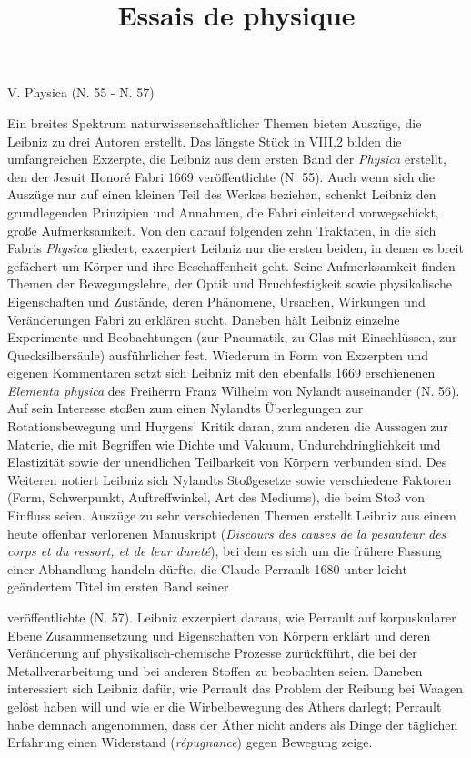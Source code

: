 \par
\vspace{3.0ex}
\noindent
V. Physica (N. 55 - N. 57)
\vspace{1.0ex}
\par\noindent
Ein breites Spektrum naturwissenschaftlicher Themen bieten Auszüge, die Leibniz zu drei Autoren erstellt. Das längste Stück in VIII,2 bilden die umfangreichen Exzerpte, die Leibniz aus dem ersten Band der \textit{Physica} erstellt, den der Jesuit Honoré Fabri 1669 veröffentlichte (N. 55). Auch wenn sich die Auszüge nur auf einen kleinen Teil des Werkes beziehen, schenkt Leibniz den grundlegenden Prinzipien und Annahmen, die Fabri einleitend vorwegschickt, gro{\ss}e Aufmerksamkeit. Von den darauf folgenden zehn Traktaten, in die sich Fabris \textit{Physica} gliedert, exzerpiert Leibniz nur die ersten beiden, in denen es breit gefächert um Körper und ihre Beschaffenheit geht. Seine Aufmerksamkeit finden Themen der Bewegungslehre, der Optik und Bruchfestigkeit sowie physikalische Eigenschaften und Zustände, deren Phänomene, Ursachen, Wirkungen und Veränderungen Fabri zu erklären sucht. Daneben hält Leibniz einzelne Experimente und Beobachtungen (zur Pneumatik, zu Glas mit Einschlüssen, zur Quecksilbersäule) ausführlicher fest. Wiederum in Form von Exzerpten und eigenen Kommentaren setzt sich Leibniz mit den ebenfalls 1669 erschienenen \textit{Elementa physica} des Freiherrn Franz Wilhelm von Nylandt auseinander (N. 56). Auf sein Interesse sto{\ss}en zum einen Nylandts Überlegungen zur Rotationsbewegung und Huygens' Kritik daran, zum anderen die Aussagen zur Materie, die mit Begriffen wie Dichte und Vakuum, Undurchdringlichkeit und Elastizität sowie der unendlichen Teilbarkeit von Körpern verbunden sind. Des Weiteren notiert Leibniz sich Nylandts Sto{\ss}gesetze sowie verschiedene Faktoren (Form, Schwerpunkt, Auftreffwinkel, Art des Mediums), die beim Sto{\ss} von Einfluss seien. Auszüge zu sehr verschiedenen Themen erstellt Leibniz aus einem heute offenbar verlorenen Manuskript (\textit{Discours des causes de la pesanteur des corps et du ressort, et de leur dureté}), bei dem es sich um die frühere Fassung einer Abhandlung handeln dürfte, die Claude Perrault 1680 unter leicht geändertem Titel im ersten Band seiner \title{Essais de physique} veröffentlichte (N. 57). Leibniz exzerpiert daraus, wie Perrault auf korpuskularer Ebene Zusammensetzung und Eigenschaften von Körpern erklärt und deren Veränderung auf physikalisch-chemische Prozesse zurückführt, die bei der Metallverarbeitung und bei anderen Stoffen zu beobachten seien. Daneben interessiert sich Leibniz dafür, wie Perrault das Problem der Reibung bei Waagen gelöst haben will und wie er die Wirbelbewegung des Äthers darlegt; Perrault habe demnach angenommen, dass der Äther nicht anders als Dinge der täglichen Erfahrung einen Widerstand (\textit{répugnance}) gegen Bewegung zeige.  
